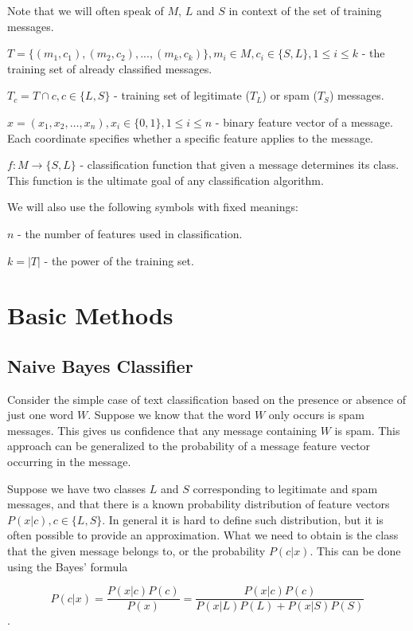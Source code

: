 \documentclass[12pt]{report}
\begin{document}
Note that we will often speak of $M$, $L$ and $S$ in context of the set of training messages.

$T = \{(m_1, c_1), (m_2, c_2), ..., (m_k, c_k)\}, m_i \in M, c_i \in \{S, L\}, 1 \leq i \leq k$ - the training set of already classified messages.

$T_c = T \cap c, c \in \{L, S\}$ - training set of legitimate ($T_L$) or spam ($T_S$) messages.

$x = (x_1, x_2, \dots, x_n), x_i \in \{0, 1\}, 1 \leq i \leq n$ - binary feature vector of a message. Each coordinate specifies whether a specific feature applies to the message.

$f : M \rightarrow \{S, L\}$ - classification function that given a message determines its class. This function is the ultimate goal of any classification algorithm.

We will also use the following symbols with fixed meanings:

$n$ - the number of features used in classification.

$k = |T|$ - the power of the training set.

\newpage


\chapter{Basic Methods}

\section{Naive Bayes Classifier}

Consider the simple case of text classification based on the presence or absence of just one word $W$. Suppose we know that the word $W$ only occurs is spam messages. This gives us confidence that any message containing $W$ is spam. This approach can be generalized to the probability of a message feature vector occurring in the message.

Suppose we have two classes $L$ and $S$ corresponding to legitimate and spam messages, and that there is a known probability distribution of feature vectors $P(x | c), c \in \{L, S\}$. In general it is hard to define such distribution, but it is often possible to provide an approximation. What we need to obtain is the class that the given message belongs to, or the probability $P(c | x)$. This can be done using the Bayes' formula

$$P(c | x) = \dfrac{P(x | c) P(c)}{P(x)} = \dfrac{P(x | c) P(c)}{P(x | L) P(L) + P(x | S) P(S)}$$.
\end{document}
